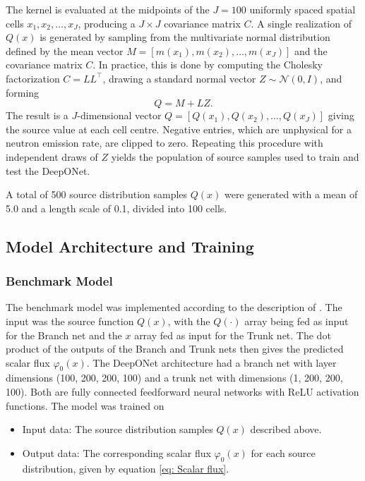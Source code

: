 \documentclass[%
 reprint,
 amsmath,amssymb,
 aps,
]{revtex4-1}
\begin{document}
The kernel is evaluated at the midpoints of the $J = 100$ uniformly spaced spatial cells $x_1, x_2, \ldots, x_J$, producing a $J \times J$
covariance matrix $C$. A single realization of $Q(x)$ is generated by sampling from the multivariate normal distribution defined by the mean
vector $M = [m(x_1), m(x_2), \ldots, m(x_J)]$ and the covariance matrix $C$. In practice, this is done by computing the Cholesky factorization
$C = L L^{\top}$, drawing a standard normal vector $Z \sim \mathcal{N}(0, I)$, and forming
\begin{equation}
    Q = M + L Z.
\end{equation}
The result is a $J$-dimensional vector $Q = [Q(x_1), Q(x_2), \ldots, Q(x_J)]$ giving the source value at each cell centre. Negative entries, which
are unphysical for a neutron emission rate, are clipped to zero. Repeating this procedure with independent draws of $Z$ yields the population of
source samples used to train and test the DeepONet.

A total of 500 source distribution samples $Q(x)$ were generated with a mean of 5.0 and a length scale of 0.1, divided into 100 cells.

\subsection{Model Architecture and Training}

\subsubsection{Benchmark Model}

The benchmark model was implemented according to the description of \cite{sahadath2026characterization}. The input was the source function
$Q(x)$, with the $Q(\cdot)$ array being fed as input for the Branch net and the $x$ array fed as input for the Trunk net. The dot product
of the outputs of the Branch and Trunk nets then gives the predicted scalar flux $\varphi_0(x)$. The DeepONet architecture had a branch net with
layer dimensions (100, 200, 200, 100) and a trunk net with dimensions (1, 200, 200, 100). Both are fully connected feedforward neural networks with
ReLU activation functions. The model was trained on
\begin{itemize}
    \item Input data: The source distribution samples $Q(x)$ described above.
    \item Output data: The corresponding scalar flux $\varphi_0(x)$ for each source distribution, given by equation \eqref{eq: Scalar flux}.
\end{itemize}
\end{document}
